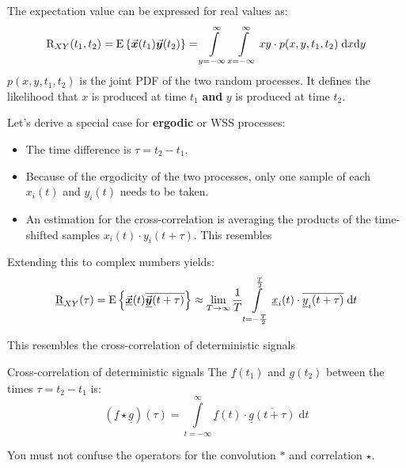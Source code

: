 \begin{refsection}
The expectation value can be expressed for real values as:
\begin{equation}
	\mathrm{R}_{XY}(t_1, t_2) = \mathrm{E}\left\{ \vec{\bm{x}}(t_1) \vec{\bm{y}}(t_2) \right\} = \int\limits_{y = -\infty}^{\infty} \int\limits_{x = -\infty}^{\infty} x y \cdot p(x, y, t_1, t_2) \; \mathrm{d} x \mathrm{d} y
\end{equation}
$p(x, y, t_1, t_2)$ is the joint \ac{PDF} of the two random processes. It defines the likelihood that $x$ is produced at time $t_1$ \textbf{and} $y$ is produced at time $t_2$.

Let's derive a special case for \textbf{ergodic} or \ac{WSS} processes:
\begin{itemize}
	\item The time difference is $\tau = t_2 - t_1$.
	\item Because of the ergodicity of the two processes, only one sample of each $x_i(t)$ and $y_i(t)$ needs to be taken.
	\item An estimation for the cross-correlation is averaging the products of the time-shifted samples $x_i(t) \cdot y_i(t+\tau)$. This resembles
\end{itemize}
Extending this to complex numbers yields:
\begin{equation}
	\underline{\mathrm{R}}_{XY}(\tau) = \mathrm{E}\left\{ \vec{\bm{\underline{x}}}(t) \overline{\vec{\bm{\underline{y}}}(t+\tau)} \right\} \approx \lim\limits_{T \rightarrow \infty} \frac{1}{T} \int\limits_{t = -\frac{T}{2}}^{\frac{T}{2}} \underline{x}_i(t) \cdot \overline{\underline{y}_i(t+\tau)} \; \mathrm{d} t
\end{equation}

This resembles the cross-correlation of deterministic signals
\begin{definition}{Cross-correlation of deterministic signals}
	The   $\underline{f}(t_1)$ and $\underline{g}(t_2)$ between the times $\tau = t_2 - t_1$ is:
	\begin{equation}
		\left(\underline{f} \star \underline{g}\right)(\tau) = \int\limits_{t = -\infty}^{\infty} \underline{f}(t) \cdot \overline{\underline{g}(t+\tau)} \; \mathrm{d} t
	\end{equation}%
\end{definition}

\begin{attention}
	You must not confuse the operators for the convolution $*$ and correlation $\star$.
\end{attention}


\end{refsection}

